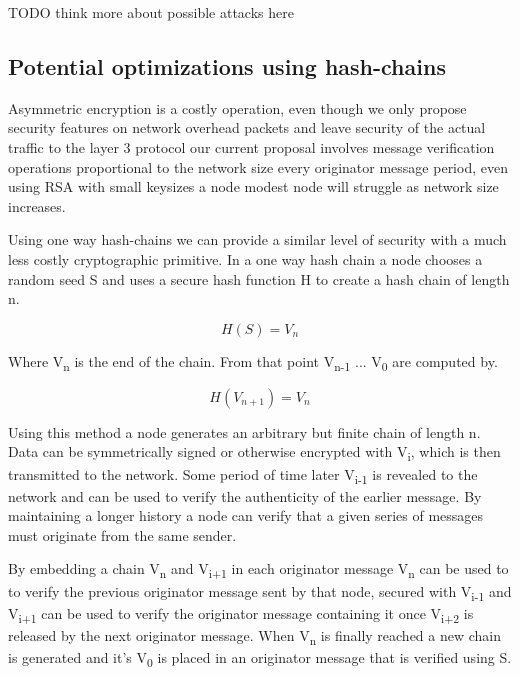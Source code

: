 \documentclass[11pt]{article}
\begin{document}
               TODO think more about possible attacks here
    
    \subsection{Potential optimizations using hash-chains}
    
               Asymmetric encryption is a costly operation, even though we only propose security features on network overhead packets and leave security of the actual traffic to the layer 3 protocol our current proposal involves message verification operations proportional to the network size every originator message period, even using RSA with small keysizes a node modest node will struggle as network size increases.
               
               Using one way hash-chains we can provide a similar level of security with a much less costly cryptographic primitive. In a one way hash chain a node chooses a random seed S and uses a secure hash function H to create a hash chain of length n. 
               
               \[H(S) = V_n\] 
               
               Where V\textsubscript{n} is the end of the chain. From that point V\textsubscript{n-1} ... V\textsubscript{0} are computed by.
               
               \[H(V_{n+1}) = V_n\] 
               
               Using this method a node generates an arbitrary but finite chain of length n. Data can be symmetrically signed or otherwise encrypted with V\textsubscript{i}, which is then transmitted to the network. Some period of time later V\textsubscript{i-1} is revealed to the network and can be used to verify the authenticity of the earlier message. By maintaining a longer history a node can verify that a given series of messages must originate from the same sender.
               
               By embedding a chain V\textsubscript{n} and V\textsubscript{i+1} in each originator message V\textsubscript{n} can be used to to verify the previous originator message sent by that node, secured with V\textsubscript{i-1} and V\textsubscript{i+1} can be used to verify the originator message containing it once V\textsubscript{i+2} is released by the next originator message. When V\textsubscript{n} is finally reached a new chain is generated and it's V\textsubscript{0} is placed in an originator message that is verified using S.      
               
\end{document}
